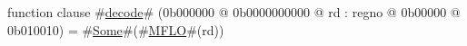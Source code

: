 function clause #\hyperref[zdecode]{decode}# (0b000000 @ 0b0000000000 @ rd : regno @ 0b00000 @ 0b010010) =
  #\hyperref[zSome]{Some}#(#\hyperref[zMFLO]{MFLO}#(rd))
